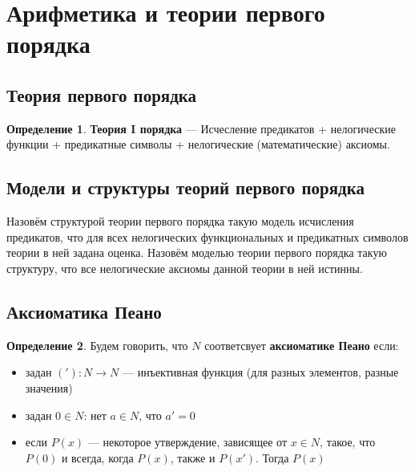 \documentclass[english]{article}
\theoremstyle{plain}
\theoremstyle{remark}
\theoremstyle{definition}
\newtheorem*{definition}{Определение}
\begin{document}
\section{Арифметика и теории первого порядка}
\label{sec:org29b37d7}
\subsection{Теория первого порядка}
\label{sec:orga7bc347}
\begin{definition}
\textbf{Теория I порядка} --- Исчесление предикатов + нелогические функции + предикатные символы + нелогические (математические) аксиомы.
\label{org1e37c31}
\end{definition}
\subsection{Модели и структуры теорий первого порядка}
\label{sec:org433ced6}
Назовём структурой теории первого порядка такую модель исчисления предикатов, что для всех нелогических
функциональных и предикатных символов теории в ней задана оценка.
Назовём моделью теории первого порядка такую структуру, что все нелогические аксиомы данной теории в ней истинны.
\subsection{Аксиоматика Пеано}
\label{sec:org8242862}
\begin{definition}
Будем говорить, что \(N\) соответсвует \textbf{аксиоматике Пеано} если:
\begin{itemize}
\item задан \(('): N \to N\) --- инъективная функция (для разных элементов, разные значения)
\item задан \(0 \in N\): нет \(a \in N\), что \(a' = 0\)
\item если \(P(x)\) --- некоторое утверждение, зависящее от \(x \in N\), такое, что \(P(0)\) и всегда, когда \(P(x)\), также и \(P(x')\). Тогда \(P(x)\)
\end{itemize}
\label{org398cbcd}
\end{definition}
\end{document}
